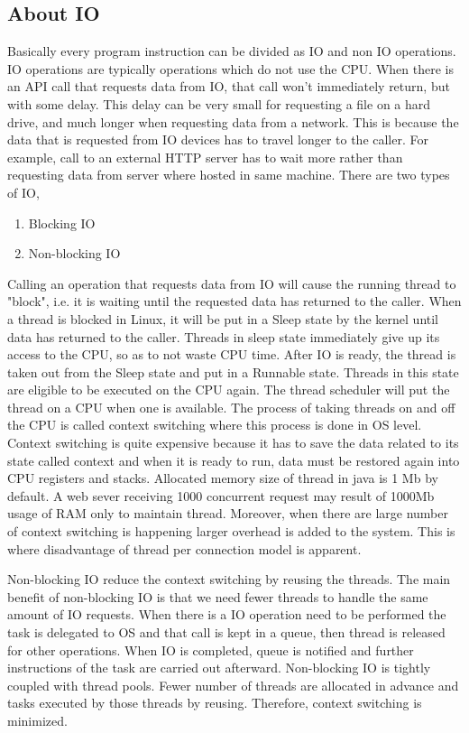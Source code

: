 \subsection{About IO}

Basically every program instruction can be divided as IO and non IO operations. IO operations are
typically operations which do not use the CPU. When there is an API call that requests data from IO,
that call won’t immediately return, but with some delay. \cite{nb_algo} This delay can be very small for
requesting a file on a hard drive, and much longer when requesting data from a network. This is
because the data that is requested from IO devices has to travel longer to the caller. For example, call to an external HTTP server has to wait more rather than requesting data from server where hosted in same machine.
There are two types of IO,

\begin{enumerate}
	\item Blocking IO
	\item Non-blocking IO
\end{enumerate}

Calling an operation that requests data from IO will cause the running thread to "block", i.e. it is
waiting until the requested data has returned to the caller. When a thread is blocked in Linux, it will be put in a Sleep state by the kernel
until data has returned to the caller. Threads in sleep state immediately give up its access to the CPU,
so as to not waste CPU time. After IO is ready, the thread is taken out from the Sleep state and put in a
Runnable state. Threads in this state are eligible to be executed on the CPU again. The thread
scheduler will put the thread on a CPU when one is available. The process of taking threads on and off
the CPU is called context switching where this process is done in OS level. Context switching is quite expensive because it has to save the data related to its state called context and when it is ready to run, data must be restored again into CPU registers and stacks. Allocated memory size of thread in java is 1 Mb by default. A web sever receiving 1000 concurrent request may result of 1000Mb usage of RAM only to maintain thread. Moreover, when there are large number of context switching is happening larger overhead is added to the system. This is where disadvantage of thread per connection model is apparent.

Non-blocking IO reduce the context switching by reusing the threads. The main benefit of non-blocking IO
is that we need fewer threads to handle the same amount of IO requests. When there is a IO operation need to be performed the task is delegated to OS and that call is kept in a queue, then thread is released for other operations. When IO is completed, queue is notified and further instructions of the task are carried out afterward. Non-blocking IO is tightly coupled with thread pools. Fewer number of threads are allocated in advance and tasks executed by those threads by reusing. Therefore, context switching is minimized.

